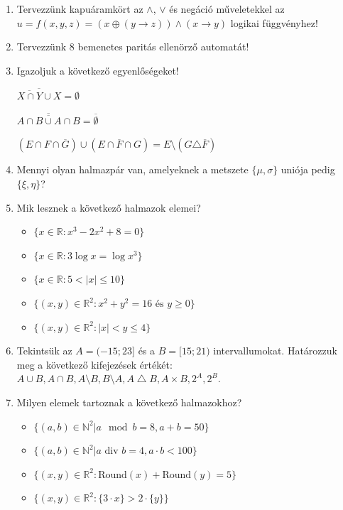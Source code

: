 \documentclass[a4paper]{article}
\begin{document}
\begin{enumerate}
\item

Tervezzünk kapuáramkört az $\wedge$, $\vee$ és negáció műveletekkel az $u = f(x, y, z) = (x \oplus (y \rightarrow z)) \wedge (x \rightarrow y)$ logikai függvényhez!

\item

Tervezzünk 8 bemenetes paritás ellenörző automatát!

\item

Igazoljuk a következő egyenlőségeket!

$\overline{\overline{X \cap Y} \cup X} = \emptyset$

$\overline{A \cap \overline{B \cup A} \cap B} = \overline{\emptyset}$

$
(E \cap F \cap \overline{G}) \cup (E \cap \overline{F} \cap G)
=
E \setminus (G \triangle \overline{F})
$

\item

Mennyi olyan halmazpár van, amelyeknek a metszete $\{\mu, \sigma\}$ uniója pedig $\{\xi, \eta\}$?

\item

Mik lesznek a következő halmazok elemei?

\begin{itemize}
    \item $\{x \in \mathbb{R} : x^3 - 2x^2 + 8 = 0\}$
    \item $\{x \in \mathbb{R} : 3\log x = \log x^3\}$
    \item $\{x \in \mathbb{R} : 5 < |x| \leq 10\}$
    \item $\{(x, y) \in \mathbb{R}^2 : x^2 + y^2 = 16 \text{ és } y \geq 0\}$
    \item $\{(x, y) \in \mathbb{R}^2 : |x| < y \leq 4\}$
\end{itemize}

\item

Tekintsük az $A = (-15; 23]$ és a $B = [15; 21)$ intervallumokat. Határozzuk meg a következő kifejezések értékét:
$A \cup B, A \cap B, A \setminus B, B \setminus A, A \bigtriangleup B, A \times B, 2^A, 2^B$.

\item

Milyen elemek tartoznak a következő halmazokhoz?

\begin{itemize}
    \item $\{(a, b) \in \mathbb{N}^2 | a \mod b = 8, a + b = 50\}$
    \item $\{(a, b) \in \mathbb{N}^2 | a \text{ div } b = 4, a \cdot b < 100\}$
    \item $\{(x, y) \in \mathbb{R}^2 : \text{Round}(x) + \text{Round}(y) = 5\}$
    \item $\{(x, y) \in \mathbb{R}^2 : \{3 \cdot x\} > 2 \cdot \{y\}\}$
\end{itemize}


\end{enumerate}
\end{document}
